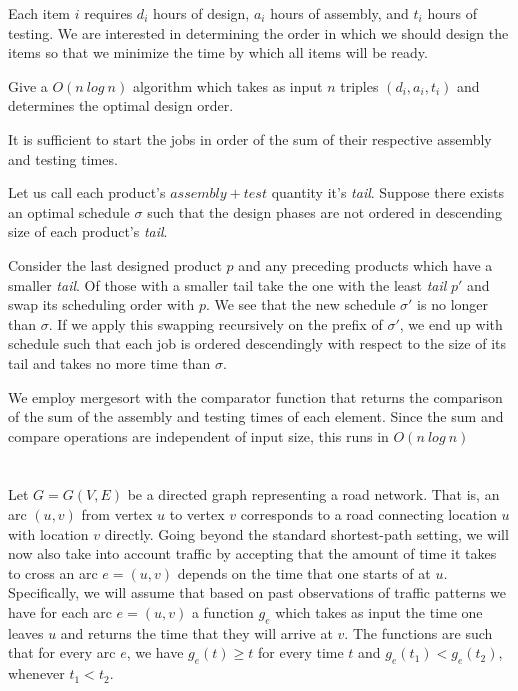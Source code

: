 \documentclass{amsart}
\theoremstyle{definition}
\theoremstyle{remark}
\numberwithin{equation}{section}
\begin{document}
Each item $i$ requires $d_i$ hours of design, $a_i$ hours of assembly, and $t_i$
hours of testing. We are interested in determining the order in which we
should design the items so that we minimize the time by which all items
will be ready.

Give a $O(n\ log\ n)$ algorithm which takes as input $n$ triples
$(d_i,a_i,t_i)$ and determines the optimal design order.

\claimstar It is sufficient to start the jobs in order of the sum of
their respective assembly and testing times.

\proof Let us call each product's $assembly + test$ quantity it's
\textit{tail}. Suppose there exists an optimal schedule $\sigma$ such
that the design phases are not ordered in descending size of each
product's \textit{tail}.

Consider the last designed product $p$ and any preceding products
which have a smaller \textit{tail}. Of those with a smaller tail take
the one with the least \textit{tail} $p'$ and swap its scheduling
order with $p$. We see that the new schedule $\sigma'$ is no longer
than $\sigma$. If we apply this swapping recursively on the prefix
of $\sigma'$, we end up with schedule such that each job is ordered
descendingly with respect to the size of its tail and takes no more
time than $\sigma$.

\alg We employ mergesort with the comparator function that returns the
comparison of the sum of the assembly and testing times of each element.
Since the sum and compare operations are independent of input size, this
runs in $O(n\ log\ n)$

\section{} Let $G = G(V, E)$ be a directed graph representing a
road network. That is, an arc $(u, v)$ from vertex $u$ to vertex
$v$ corresponds to a road connecting location $u$ with location $v$
directly. Going beyond the standard shortest-path setting, we will now
also take into account traffic by accepting that the amount of time it
takes to cross an arc $e = (u, v)$ depends on the time that one starts
of at $u$. Specifically, we will assume that based on past observations
of traffic patterns we have for each arc $e = (u, v)$ a function $g_e$
which takes as input the time one leaves $u$ and returns the time that
they will arrive at $v$. The functions are such that for every arc $e$,
we have $g_e(t) \geq t$ for every time $t$ and $g_e(t_1) < g_e(t_2)$,
whenever $t_1 < t_2$.
\end{document}
